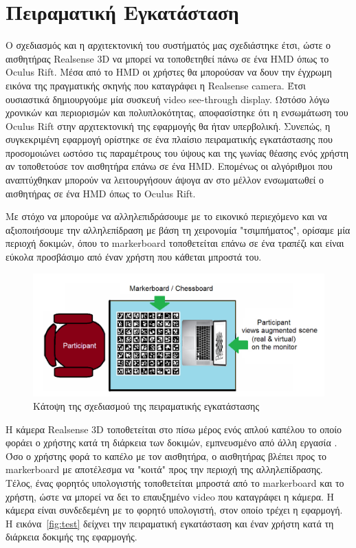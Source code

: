 \section{Πειραματική Εγκατάσταση}

Ο σχεδιασμός και η αρχιτεκτονική του συστήματός μας σχεδιάστηκε έτσι, ώστε ο αισθητήρας Realsense 3D να μπορεί να τοποθετηθεί πάνω σε ένα HMD όπως το Oculus Rift. Μέσα από το HMD οι χρήστες θα μπορούσαν να δουν την έγχρωμη εικόνα της πραγματικής σκηνής που καταγράφει η Realsense camera. Έτσι ουσιαστικά δημιουργούμε μία συσκευή video see-through display. Ωστόσο λόγω χρονικών και περιορισμών και πολυπλοκότητας, αποφασίστηκε ότι η ενσωμάτωση του Oculus Rift στην αρχιτεκτονική της εφαρμογής θα ήταν υπερβολική. Συνεπώς, η συγκεκριμένη εφαρμογή ορίστηκε σε ένα πλαίσιο πειραματικής εγκατάστασης που προσομοιώνει ωστόσο τις παραμέτρους του ύψους και της γωνίας θέασης ενός χρήστη αν τοποθετούσε τον αισθητήρα επάνω σε ένα HMD. Επομένως οι αλγόριθμοι που αναπτύχθηκαν μπορούν να λειτουργήσουν άψογα αν στο μέλλον ενσωματωθεί ο αισθητήρας σε ένα HMD όπως το Oculus Rift. 


Με στόχο να μπορούμε να αλληλεπιδράσουμε με το εικονικό περιεχόμενο και να αξιοποιήσουμε την αλληλεπίδραση με βάση τη χειρονομία "τσιμπήματος", ορίσαμε μία περιοχή δοκιμών, όπου το markerboard τοποθετείται επάνω σε ένα τραπέζι και είναι εύκολα προσβάσιμο από έναν χρήστη που κάθεται μπροστά του. 


\begin{figure}[H]
    \centering
    \includegraphics[scale=0.8, angle=0]{Files/Figures/planviewoftheexperimentalsetup.png}
    \caption[Κάτοψη της σχεδιασμού της πειραματικής εγκατάστασης]{Κάτοψη της σχεδιασμού της πειραματικής εγκατάστασης}
    \label{fig:ps3game}
\end{figure}


Η κάμερα Realsense 3D τοποθετείται στο πίσω μέρος ενός απλού καπέλου το οποίο φοράει ο χρήστης κατά τη διάρκεια των δοκιμών, εμπνευσμένο από άλλη εργασία \cite{Mathews2007}. Όσο ο χρήστης φορά το καπέλο με τον αισθητήρα, ο αισθητήρας βλέπει προς το markerboard με αποτέλεσμα να "κοιτά" προς την περιοχή της αλληλεπίδρασης. Τέλος, ένας φορητός υπολογιστής τοποθετείται μπροστά από το markerboard και το χρήστη, ώστε να μπορεί να δει το επαυξημένο video που καταγράφει η κάμερα. Η κάμερα είναι συνδεδεμένη με το φορητό υπολογιστή, στον οποίο τρέχει η εφαρμογή. Η εικόνα~\ref{fig:test} δείχνει την πειραματική εγκατάσταση και έναν χρήστη κατά τη διάρκεια δοκιμής της εφαρμογής.



